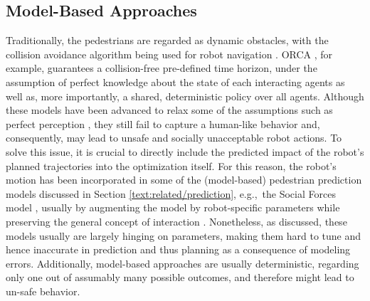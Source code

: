 \subsection{Model-Based Approaches}
Traditionally, the pedestrians are regarded as dynamic obstacles, with the collision avoidance algorithm being used for robot navigation \cite{vandenBerg2011}\cite{Fox1997}\cite{Luo2018a}\cite{Phillips2011}. \ac{ORCA} \cite{vandenBerg2011}, for example, guarantees a collision-free pre-defined time horizon, under the assumption of perfect knowledge about the state of each interacting agents as well as, more importantly, a shared, deterministic policy over all agents. Although these models have been advanced to relax some of the assumptions such as perfect perception \cite{Hennes2012}, they still fail to capture a human-like behavior and, consequently, may lead to unsafe and socially unacceptable robot actions. To solve this issue, it is crucial to directly include the predicted impact of the robot's planned trajectories into the optimization itself. For this reason, the robot's motion has been incorporated in some of the (model-based) pedestrian prediction models discussed in Section \ref{text:related/prediction}, e.g.,\ the Social Forces model \cite{Helbing1995}, usually by augmenting the model by robot-specific parameters while preserving the general concept of interaction \cite{Ferrer2013}\cite{Luo2018a}. Nonetheless, as discussed, these models usually are largely hinging on parameters, making them hard to tune and hence inaccurate in prediction and thus planning as a consequence of modeling errors. Additionally, model-based approaches are usually deterministic, regarding only one out of assumably many possible outcomes, and therefore might lead to un-safe behavior.

